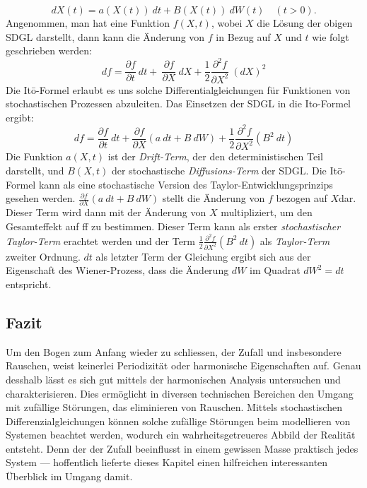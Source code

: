 \begin{equation}
	dX(t) = a(X(t)) \ dt + B(X(t)) \ dW(t) \quad (t>0).
\end{equation}
Angenommen, man hat eine Funktion $ f(X,t) $, wobei $ X $ die Lösung der obigen SDGL darstellt, dann kann die Änderung von $ f $ in Bezug auf $ X $ und $ t $ wie folgt geschrieben werden:
\begin{equation}
	df = \frac{\partial f}{\partial t} \ dt + \ \frac{\partial f}{\partial X} \ dX + \frac{1}{2} \frac{\partial^2 f} {\partial X^2} \ (dX)^2	
\end{equation}
Die Itō-Formel erlaubt es uns solche Differentialgleichungen für Funktionen von stochastischen Prozessen abzuleiten. Das Einsetzen der SDGL in die Ito-Formel ergibt:
\begin{equation}
	df = \frac{\partial f}{\partial t} \ dt + \frac{\partial f}{\partial X} (a \ dt + B \ dW) + \frac{1}{2} \frac{\partial^2 f}{\partial X^2} (B^2 \ dt)
\end{equation}
Die Funktion $ a(X,t) $ ist der \textit{Drift-Term}, der den deterministischen Teil darstellt, und $ B(X,t) $ der stochastische \textit{Diffusions-Term} der SDGL. Die Itō-Formel kann als eine stochastische Version des Taylor-Entwicklungsprinzips gesehen werden. $ \frac{\partial f}{\partial X} (a \ dt + B \ dW) $ stellt die Änderung von $ f $ bezogen auf $ X $dar. Dieser Term wird dann mit der Änderung von $ X $ multipliziert, um den Gesamteffekt auf ff zu bestimmen. Dieser Term kann als erster \textit{stochastischer Taylor-Term} erachtet werden und der Term $ \frac{1}{2} \frac{\partial^2 f}{\partial X^2} (B^2 \ dt) $ als \textit{Taylor-Term} zweiter Ordnung. $ dt $ als letzter Term der Gleichung ergibt sich aus der Eigenschaft des Wiener-Prozess, dass die Änderung $ dW $ im Quadrat $ dW^2 = dt $ entspricht. 

\subsection{Fazit\label{brown:fazit}}

Um den Bogen zum Anfang wieder zu schliessen, der Zufall und insbesondere Rauschen, weist keinerlei Periodizität oder harmonische Eigenschaften auf. Genau desshalb lässt es sich gut mittels der harmonischen Analysis untersuchen und charakterisieren. Dies ermöglicht in diversen technischen Bereichen den Umgang mit zufällige Störungen, das eliminieren von Rauschen. 
Mittels stochastischen Differenzialgleichungen können solche zufällige Störungen beim modellieren von Systemen beachtet werden, wodurch ein wahrheitsgetreueres Abbild der Realität entsteht. Denn der der Zufall beeinflusst in einem gewissen Masse praktisch jedes System --- hoffentlich lieferte dieses Kapitel einen hilfreichen interessanten Überblick im Umgang damit.

